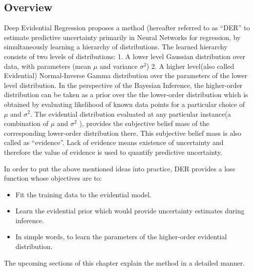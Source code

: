 	\subsection{Overview}\label{sec_overview_der}  
	Deep Evidential Regression proposes a method (hereafter referred to as \enquote{DER} to estimate predictive uncertainty primarily in Neural Networks for regression, by simultaneously learning a hierarchy of distributions. The learned hierarchy consists of two levels of distributions: 1. A lower level Gaussian distribution over data, with parameters (mean $\mu$ and variance $\sigma^2$) 2. A higher level(also called Evidential) Normal-Inverse Gamma distribution over the parameters of the lower level distribution. In the perspective of the Bayesian Inference, the higher-order distribution can be taken as a prior over the the lower-order distribution which is obtained by evaluating likelihood of known data points for a particular choice of $\mu$ and $\sigma^2$. The evidential distribution evaluated at any particular instance(a combination of $\mu$ and $\sigma^2$  ), provides the subjective belief mass of the corresponding lower-order distribution there. This subjective belief mass is also called as \enquote{evidence}. Lack of evidence means existence of uncertainty and therefore the value of evidence is used to quantify predictive uncertainty. 
	
	In order to put the above mentioned ideas into practice, DER provides a loss function whose objectives are to:
	\begin{itemize}
		\item Fit the training data to the evidential model.
		\item Learn the evidential prior which would provide uncertainty estimates during inference.
		\item In simple words, to learn the parameters of the higher-order evidential distribution.    
	\end{itemize} 
	The upcoming sections of this chapter explain the method in a detailed manner.
	
